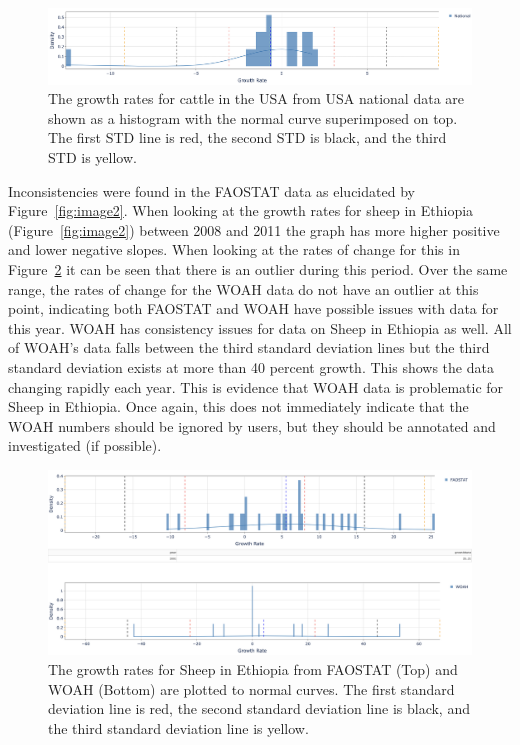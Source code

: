 \documentclass{article}
\begin{document}
\begin{figure}[h!]
    \centering
    \includegraphics[width=1\textwidth]{image4}
    \caption{The growth rates for cattle in the USA from USA national data are shown as a histogram with the normal curve superimposed on top. The first STD line is red, the second STD is black, and the third STD is yellow.}
    \label{fig:image4}
\end{figure}

Inconsistencies were found in the FAOSTAT data as elucidated by Figure~\ref{fig:image2}. When looking at the growth rates for sheep in Ethiopia (Figure~\ref{fig:image2}) between 2008 and 2011 the graph has more higher positive and lower negative slopes. When looking at the rates of change for this in Figure~\ref{fig:image5} it can be seen that there is an outlier during this period. Over the same range, the rates of change for the WOAH data do not have an outlier at this point, indicating both FAOSTAT and WOAH have possible issues with data for this year. WOAH has consistency issues for data on Sheep in Ethiopia as well. All of WOAH's data falls between the third standard deviation lines but the third standard deviation exists at more than 40 percent growth. This shows the data changing rapidly each year. This is evidence that WOAH data is problematic for Sheep in Ethiopia. Once again, this does not immediately indicate that the WOAH numbers should be ignored by users, but they should be annotated and investigated (if possible).

\begin{figure}[h!]
    \centering
    \includegraphics[width=1\textwidth]{image5}
    \caption{The growth rates for Sheep in Ethiopia from FAOSTAT (Top) and WOAH (Bottom) are plotted to normal curves. The first standard deviation line is red, the second standard deviation line is black, and the third standard deviation line is yellow.}
    \label{fig:image5}
\end{figure}
\end{document}
